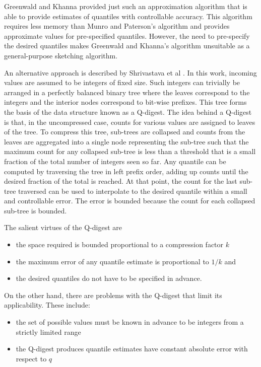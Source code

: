 \documentclass{vldb}
\begin{document}
Greenwald and Khanna\cite{Greenwald-space-efficient-online-quantiles} provided just such an approximation algorithm that is able to provide estimates of quantiles with controllable accuracy. This algorithm requires less memory than Munro and Paterson's algorithm and provides approximate values for pre-specified quantiles. However, the need to pre-specify the desired quantiles makes Greenwald and Khanna's algorithm unsuitable as a general-purpose sketching algorithm.

An alternative approach is described by Shrivastava et al \cite{qdigest}.  In this work, incoming values are assumed to be integers of fixed size. Such integers can trivially be arranged in a perfectly balanced binary tree where the leaves correspond to the integers and the interior nodes correspond to bit-wise prefixes. This tree forms the basis of the data structure known as a Q-digest.  The idea behind a Q-digest is that, in the uncompressed case, counts for various values are assigned to leaves of the tree.  To compress this tree, sub-trees are collapsed and counts from the leaves are aggregated into a single node representing the sub-tree such that the maximum count for any collapsed sub-tree is less than a threshold that is a small fraction of the total number of integers seen so far.  Any quantile can be computed by traversing the tree in left prefix order, adding up counts until the desired fraction of the total is reached.  At that point, the count for the last sub-tree traversed can be used to interpolate to the desired quantile within a small and controllable error.  The error is bounded because the count for each collapsed sub-tree is bounded.

The salient virtues of the Q-digest are
\begin{itemize}[nosep, topsep=-10pt]
\item the space required is bounded proportional to a compression factor $k$
\item the maximum error of any quantile estimate is proportional to $1/k$ and
\item the desired quantiles do not have to be specified in advance.
\vspace{10pt}
\end{itemize}

On the other hand, there are problems with the Q-digest that  limit its applicability. These include:
\begin{itemize}[nosep, topsep=-10pt]
\item  the set of possible values must be known in advance to be integers from a strictly limited range
\item  the Q-digest produces quantile estimates have constant absolute error with respect to $q$
\vspace{10pt}
\end{itemize}
\end{document}
